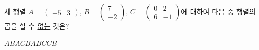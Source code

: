 세 행렬 $A=\begin{pmatrix} -5 & 3 \end{pmatrix}$, $B=\begin{pmatrix} 7 \\ -2 \end{pmatrix}$, $C=\begin{pmatrix} 0 & 2 \\ 6 & -1 \end{pmatrix}$에 대하여 다음 중 행렬의 곱을 할 수 \underline{없는} 것은?
\begin{choices32}{$AB$}{$AC$}{$BA$}{$BC$}{$CB$}\end{choices32}
